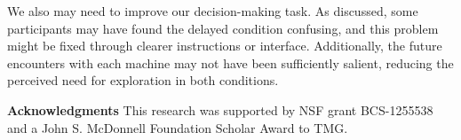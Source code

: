 \documentclass[10pt,letterpaper]{article}
\begin{document}
We also may need to improve our decision-making task. As discussed, some
participants may have found the delayed condition confusing, and this problem
might be fixed through clearer instructions or interface. Additionally, the
future encounters with each machine may not have been sufficiently salient,
reducing the perceived need for exploration in both conditions.


\begin{small}
  \noindent
\textbf{Acknowledgments}  This research was supported by NSF grant BCS-1255538 and a John S. McDonnell Foundation Scholar Award to TMG.
\end{small}



\end{document}
